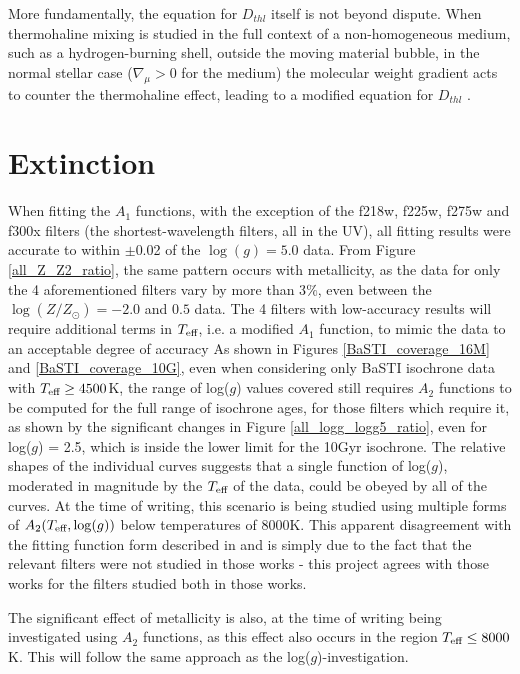 \documentclass[12pt, a4paper]{report}
\begin{document}
More fundamentally, the equation for $D_{thl}$ itself is not beyond dispute. When thermohaline mixing is studied in the full context of a non-homogeneous medium, such as a hydrogen-burning shell, outside the moving material bubble, in the normal stellar case ($\nabla _{\mu} > 0$ for the medium) the molecular weight gradient acts to counter the thermohaline effect, leading to a modified equation for $D_{thl}$ \citep{2010ApJ...723..563D}.

\section{Extinction}
When fitting the $A_{1}$ functions, with the exception of the f218w, f225w, f275w and f300x filters (the shortest-wavelength filters, all in the UV), all fitting results were accurate to within $\pm$0.02 of the $\log(g) = 5.0$ data. From Figure \ref{all_Z_Z2_ratio}, the same pattern occurs with metallicity, as the data for only the 4 aforementioned filters vary by more than 3$\%$, even between the $\log(Z/Z_{\odot}) = -2.0$ and $0.5$ data.
The 4 filters with low-accuracy results will require additional terms in $T_{\textnormal{eff}}$, i.e. a modified  $A_{1}$ function, to mimic the data to an acceptable degree of accuracy
As shown in Figures \ref{BaSTI_coverage_16M} and \ref{BaSTI_coverage_10G}, even when considering only BaSTI isochrone data with $T_{\textnormal{eff}} \geq 4500$K, the range of log($g$) values covered still requires $A_{2}$ functions to be computed for the full range of isochrone ages, for those filters which require it, as shown by the significant changes in Figure \ref{all_logg_logg5_ratio}, even for log($g$) = 2.5, which is inside the lower limit for the 10Gyr isochrone. The relative shapes of the individual curves suggests that a single function of log($g$), moderated in magnitude by the $T_{\textnormal{eff}}$ of the data, could be obeyed by all of the curves. At the time of writing, this scenario is being studied using multiple forms of $A_{2}(T_{\textnormal{eff}},\log(g))$ below temperatures of 8000K. This apparent disagreement with the fitting function form described in \cite{2018MNRAS.475.5023C} and \cite{2018MNRAS.479L.102C} is simply due to the fact that the relevant filters were not studied in those works - this project agrees with those works for the filters studied both in those works.

The significant effect of metallicity is also, at the time of writing being investigated using $A_{2}$ functions, as this effect also occurs in the region $T_{\textnormal{eff}} \leq 8000$K. This will follow the same approach as the log($g$)-investigation.
\end{document}

